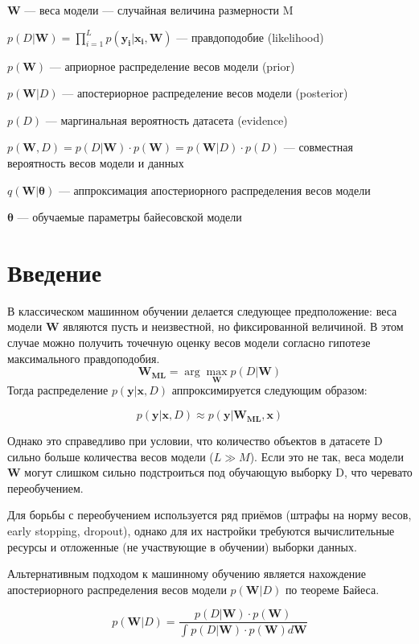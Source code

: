\documentclass{article}
\newcommand{\argmax}{\arg\!\max}
\begin{document}
$\mathbf{W}$ --- веса модели --- случайная величина размерности M

$p(D | \mathbf{W}) = \prod_{i=1}^{L} p(\mathbf{y_i} | \mathbf{x_i}, \mathbf{W})$ — правдоподобие (likelihood)

$p(\mathbf{W})$ --- априорное распределение весов модели (prior)

$p(\mathbf{W}| D)$ --- апостериорное распределение весов модели (posterior)

$p(D)$ --- маргинальная вероятность датасета (evidence)

$p(\mathbf{W}, D) =
p(D | \mathbf{W}) \cdot p(\mathbf{W}) =
p(\mathbf{W}| D)\cdot p(D)$
--- совместная вероятность весов модели и данных

$q(\mathbf{W} | \pmb{\theta})$ --- аппроксимация апостериорного распределения весов модели

$\pmb{\theta}$ --- обучаемые параметры байесовской модели

\section{Введение}

В классическом машинном обучении делается следующее предположение: веса модели $\mathbf{W}$ являются пусть и неизвестной, но фиксированной величиной.
В этом случае можно получить точечную оценку весов модели согласно гипотезе максимального правдоподобия.
\[
\mathbf{W_{ML}} = \argmax_{\mathbf{W}} p(D | \mathbf{W})
\]
Тогда распределение $p(\mathbf{y} | \mathbf{x}, D)$ аппроксимируется следующим образом:

\[
p(\mathbf{y} | \mathbf{x}, D) \approx p(\mathbf{y} | \mathbf{W_{ML}}, \mathbf{x})
\]

Однако это справедливо при условии, что количество объектов в датасете D сильно больше количества весов модели ($L \gg M$).
Если это не так, веса модели $\mathbf{W}$ могут слишком сильно подстроиться под обучающую выборку D, что черевато переобучением.

Для борьбы с переобучением используется ряд приёмов (штрафы на норму весов, early stopping, dropout), однако для их настройки требуются вычислительные ресурсы и отложенные (не участвующие в обучении) выборки данных.

Альтернативным подходом к машинному обучению является нахождение апостериорного распределения весов модели $p(\mathbf{W}| D)$ по теореме Байеса.

\[
p(\mathbf{W}| D) =
\dfrac{p(D | \mathbf{W}) \cdot p(\mathbf{W})}{\int_{}{} p(D | \mathbf{W}) \cdot p(\mathbf{W}) d\mathbf{W}}
\]
\end{document}
